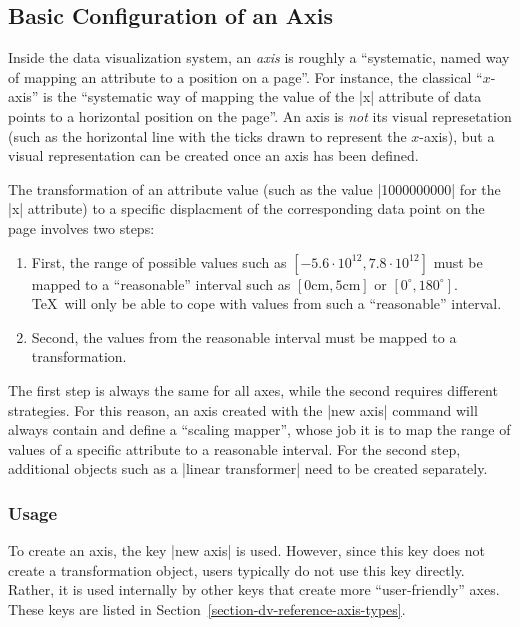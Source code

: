 \subsection{Basic Configuration of an Axis}
\label{section-dv-axes-main}

Inside the data visualization system, an \emph{axis} is roughly a
``systematic, named way of mapping an attribute to a 
position on a page''. For instance, the classical ``$x$-axis'' is the
``systematic way of mapping the value of the |x| attribute of data
points to a horizontal position on the page''. An axis is \emph{not}
its visual represetation (such as the horizontal line with the ticks
drawn to represent the $x$-axis), but a visual representation can be
created once an axis has been defined.

The transformation of an attribute value (such as the value |1000000000|
for the |x| attribute) to a specific displacment of the corresponding
data point on the page involves two steps:
\begin{enumerate}
\item First, the range of possible values such as $[-5.6\cdot
  10^{12},7.8\cdot 10^{12}]$ must be mapped to a ``reasonable''
  interval such as $[0\mathrm{cm},5\mathrm{cm}]$ or
  $[0^\circ,180^\circ]$. \TeX\ will only be able to cope with values
  from such a ``reasonable'' interval.
\item Second, the values from the reasonable interval must be mapped
  to a transformation.
\end{enumerate}
The first step is always the same for all axes, while the second
requires different strategies. For this reason, an axis created with
the |new axis| command will always contain and define a ``scaling
mapper'', whose job it is to map the range of values of a specific
attribute to a reasonable interval. For the second step, additional
objects such as a |linear transformer| need to be created separately.  


\subsubsection{Usage}

To create an axis, the key |new axis| is used. However, since this key
does not create a transformation object, users typically do not use
this key directly. Rather, it is used internally by other keys
that create more ``user-friendly'' axes. These keys are listed in
Section~\ref{section-dv-reference-axis-types}. 

